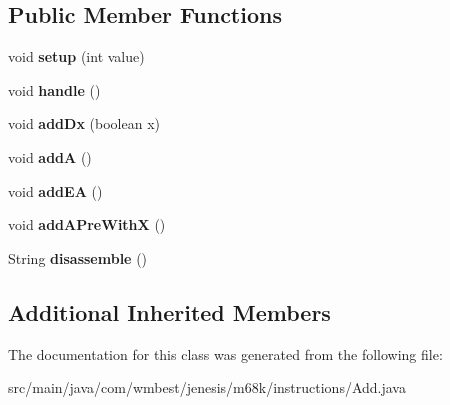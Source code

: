 \subsection*{Public Member Functions}
\begin{DoxyCompactItemize}
\item 
\hypertarget{classcom_1_1wmbest_1_1jenesis_1_1m68k_1_1instructions_1_1Add_a1b016d95c398cf862696d0d0af9b24bd}{void {\bfseries setup} (int value)}\label{classcom_1_1wmbest_1_1jenesis_1_1m68k_1_1instructions_1_1Add_a1b016d95c398cf862696d0d0af9b24bd}

\item 
\hypertarget{classcom_1_1wmbest_1_1jenesis_1_1m68k_1_1instructions_1_1Add_a4d3d938927508405b8352034e4593a0c}{void {\bfseries handle} ()}\label{classcom_1_1wmbest_1_1jenesis_1_1m68k_1_1instructions_1_1Add_a4d3d938927508405b8352034e4593a0c}

\item 
\hypertarget{classcom_1_1wmbest_1_1jenesis_1_1m68k_1_1instructions_1_1Add_ad5ed3cc71c9e93531446afd43a42717f}{void {\bfseries add\-Dx} (boolean x)}\label{classcom_1_1wmbest_1_1jenesis_1_1m68k_1_1instructions_1_1Add_ad5ed3cc71c9e93531446afd43a42717f}

\item 
\hypertarget{classcom_1_1wmbest_1_1jenesis_1_1m68k_1_1instructions_1_1Add_a56e9f755aea4809196ccdd070ace3768}{void {\bfseries add\-A} ()}\label{classcom_1_1wmbest_1_1jenesis_1_1m68k_1_1instructions_1_1Add_a56e9f755aea4809196ccdd070ace3768}

\item 
\hypertarget{classcom_1_1wmbest_1_1jenesis_1_1m68k_1_1instructions_1_1Add_a56f41c9b847e1c71b46ff831a92843f1}{void {\bfseries add\-E\-A} ()}\label{classcom_1_1wmbest_1_1jenesis_1_1m68k_1_1instructions_1_1Add_a56f41c9b847e1c71b46ff831a92843f1}

\item 
\hypertarget{classcom_1_1wmbest_1_1jenesis_1_1m68k_1_1instructions_1_1Add_af9a31900b69a79370566305c1288e4c8}{void {\bfseries add\-A\-Pre\-With\-X} ()}\label{classcom_1_1wmbest_1_1jenesis_1_1m68k_1_1instructions_1_1Add_af9a31900b69a79370566305c1288e4c8}

\item 
\hypertarget{classcom_1_1wmbest_1_1jenesis_1_1m68k_1_1instructions_1_1Add_ac55226b746c7e44aa407af1e369bebc7}{String {\bfseries disassemble} ()}\label{classcom_1_1wmbest_1_1jenesis_1_1m68k_1_1instructions_1_1Add_ac55226b746c7e44aa407af1e369bebc7}

\end{DoxyCompactItemize}
\subsection*{Additional Inherited Members}


The documentation for this class was generated from the following file\-:\begin{DoxyCompactItemize}
\item 
src/main/java/com/wmbest/jenesis/m68k/instructions/Add.\-java\end{DoxyCompactItemize}
